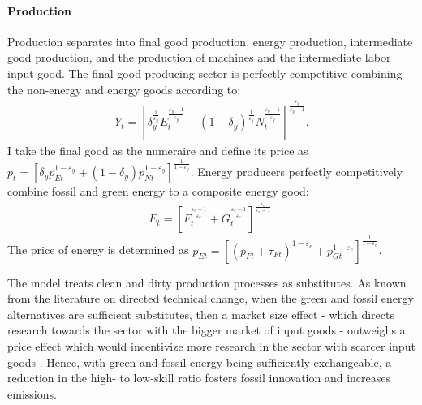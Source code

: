
\paragraph{Production}
Production separates into final good production, energy production, intermediate good production, and the production of machines and the intermediate labor input good. 
The final good producing sector is perfectly competitive combining the non-energy and energy goods according to:
\begin{align}
Y_t=\left[\delta_y^\frac{1}{\varepsilon_y}E_{t}^{\frac{\varepsilon_y-1}{\varepsilon_y}}+(1-\delta_y)^\frac{1}{\varepsilon_y}N_{t}^{\frac{\varepsilon_y-1}{\varepsilon_y}}\right]^\frac{\varepsilon_y}{\varepsilon_y-1}.
\end{align} 
I take the final good as the numeraire and define its price as $p_t=\left[\delta_yp_{Et}^{1-\varepsilon_y}+(1-\delta_y)p_{Nt}^{1-\varepsilon_y}\right]^{\frac{1}{1-\varepsilon_y}}$.
Energy producers perfectly competitively combine fossil and green energy to a composite energy good:
\begin{align}
E_t=\left[F_t^\frac{\varepsilon_e-1}{\varepsilon_e}+G_t^\frac{\varepsilon_e-1}{\varepsilon_e}\right]^\frac{\varepsilon_e}{\varepsilon_e-1}.
\end{align}
The price of energy is determined as  $p_{Et}= \left[(p_{Ft}+\tau_{Ft})^{1-\varepsilon_e}+p_{Gt}^{1-\varepsilon_e}\right]^\frac{1}{{1-\varepsilon_e}}$.

The model treats clean and dirty production processes as substitutes. As known from the literature on directed technical change, when the green and fossil energy alternatives are sufficient substitutes, then a market size effect - which directs research towards the sector with the bigger market of input goods - outweighs a price effect which would incentivize more research in the sector with scarcer input goods \citep{Hemous2021DirectedEconomics}. Hence, with green and fossil energy being sufficiently exchangeable, a reduction in the high- to low-skill ratio fosters fossil innovation and increases emissions. 

